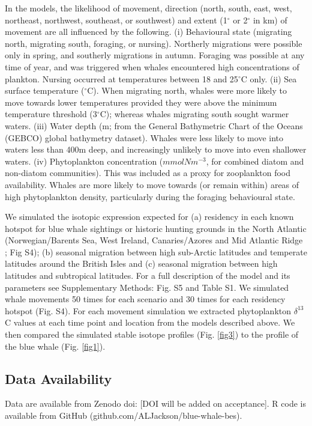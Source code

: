 \documentclass[a4paper,12pt]{article}
\begin{document}
In the models, the likelihood of movement, direction (north, south, east, west, northeast, northwest, southeast, or southwest) and extent (1$^{\circ}$ or 2$^{\circ}$ in km) of movement are all influenced by the following. 
(i) Behavioural state (migrating north, migrating south, foraging, or nursing). 
Northerly migrations were possible only in spring, and southerly migrations in autumn. 
Foraging was possible at any time of year, and was triggered when whales encountered high concentrations of plankton. Nursing occurred at temperatures between 18 and 25$^{\circ}$C only. 
(ii) Sea surface temperature\cite{yool2013medusa} ($^{\circ}$C). 
When migrating north, whales were more likely to move towards lower temperatures provided they were above the minimum temperature threshold (3$^{\circ}$C); whereas whales migrating south sought warmer waters. 
(iii) Water depth (m; from the General Bathymetric Chart of the Oceans (GEBCO) global bathymetry dataset). 
Whales were less likely to move into waters less than 400m deep, and increasingly unlikely to move into even shallower waters. 
(iv) Phytoplankton concentration ($mmolNm^{-3}$, for combined diatom and non-diatom communities\cite{yool2013medusa}). 
This was included as a proxy for zooplankton food availability. 
Whales are more likely to move towards (or remain within) areas of high phytoplankton density, particularly during the foraging behavioural state. 
 
We simulated the isotopic expression expected for (a) residency in each known hotspot for blue whale sightings or historic hunting grounds in the North Atlantic (Norwegian/Barents Sea, West Ireland, Canaries/Azores and Mid Atlantic Ridge\cite{mcdonald2006biogeographic,reilly2008balaenoptera,sigurjonsson1995life} ; Fig S4); (b) seasonal migration between high sub-Arctic latitudes and temperate latitudes around the British Isles and (c) seasonal migration between high latitudes and subtropical latitudes. 
For a full description of the model and its parameters see Supplementary Methods: Fig. S5 and Table S1. 
We simulated whale movements 50 times for each scenario and 30 times for each residency hotspot (Fig. S4). 
For each movement simulation we extracted phytoplankton $\delta^{13}$C values at each time point and location from the models described above\cite{magozzi2017using}. 
We then compared the simulated stable isotope profiles (Fig. \ref{fig3}) to the profile of the blue whale (Fig. \ref{fig1}).
 
\subsection{Data Availability}
Data are available from Zenodo doi: [DOI will be added on acceptance]. 
R code is available from GitHub (github.com/ALJackson/blue-whale-bes).
\end{document}
